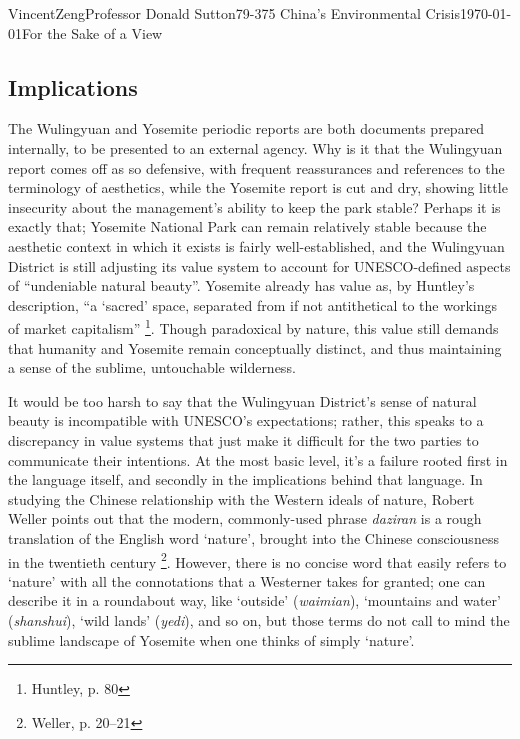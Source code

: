 \documentclass[12pt]{article}
\begin{document}
\begin{mla}{Vincent}{Zeng}{Professor Donald Sutton}{79-375 China's Environmental Crisis}{\today}{For the Sake of a View}
\subsection*{Implications}

The Wulingyuan and Yosemite periodic reports are both documents prepared
internally, to be presented to an external agency. Why is it that the
Wulingyuan report comes off as so defensive, with frequent reassurances and
references to the terminology of aesthetics, while the Yosemite report is cut
and dry, showing little insecurity about the management's ability to keep the
park stable? Perhaps it is exactly that; Yosemite National Park can remain
relatively stable because the aesthetic context in which it exists is fairly
well-established, and the Wulingyuan District is still adjusting its value
system to account for UNESCO-defined aspects of ``undeniable natural beauty''.
Yosemite already has value as, by Huntley's description, ``a `sacred' space, separated from if not
antithetical to the workings of market capitalism'' \footnote{Huntley, p. 80}.
Though paradoxical by nature, this value still demands that humanity and
Yosemite remain conceptually distinct, and thus maintaining a sense of the
sublime, untouchable wilderness.

It would be too harsh to say that the Wulingyuan District's sense of natural
beauty is incompatible with UNESCO's expectations; rather, this speaks to a
discrepancy in value systems that just make it difficult for the two parties to
communicate their intentions. At the most basic level, it's a failure rooted
first in the language itself, and secondly in the implications behind that
language. In studying the Chinese relationship with the Western ideals of
nature, Robert Weller points out that the modern, commonly-used phrase
\textit{daziran} is a rough translation of the English word `nature', brought
into the Chinese consciousness in the twentieth century \footnote{Weller, p.
20--21}. However, there is no concise word that easily refers to `nature' with
all the connotations that a Westerner takes for granted; one can describe it in
a roundabout way, like `outside' (\textit{waimian}), `mountains and water'
(\textit{shanshui}), `wild lands' (\textit{yedi}), and so on, but those terms
do not call to mind the sublime landscape of Yosemite when one thinks of simply `nature'.


\end{mla}
\end{document}

